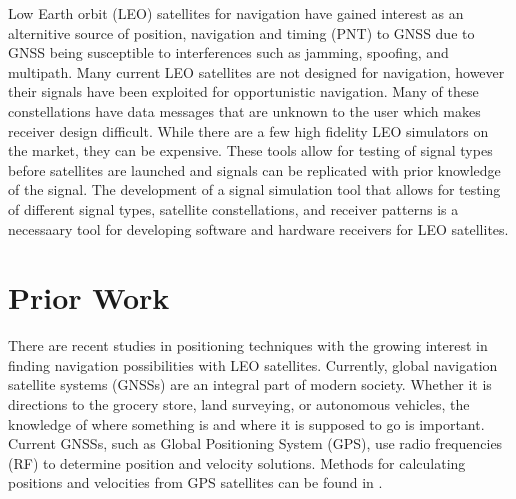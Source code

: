 \documentclass[12pt]{report}
\begin{document}
Low Earth orbit (LEO) satellites for navigation have gained interest as an alternitive source of position, navigation and timing (PNT) to GNSS due to GNSS being susceptible to interferences such as jamming, spoofing, and multipath. Many current LEO satellites are not designed for navigation, however their signals have been exploited for opportunistic navigation. Many of these constellations have data messages that are unknown to the user which makes receiver design difficult. While there are a few high fidelity LEO simulators on the market, they can be expensive. These tools allow for testing of signal types before satellites are launched and signals can be replicated with prior knowledge of the signal. The development of a signal simulation tool that allows for testing of different signal types, satellite constellations, and receiver patterns is a necessaary tool for developing software and hardware receivers for LEO satellites.  

\section { Prior Work }

There are recent studies in positioning techniques with the growing interest in finding navigation possibilities with LEO satellites. Currently, global navigation satellite systems (GNSSs) are an integral part of modern society. Whether it is directions to the grocery store, land surveying, or autonomous vehicles, the knowledge of where something is and where it is supposed to go is important. Current GNSSs, such as Global Positioning System (GPS), use radio frequencies (RF) to determine position and velocity solutions. Methods for calculating positions and velocities from GPS satellites can be found in \cite{misraGlobalPositioningSystem2012}. 
\end{document}
